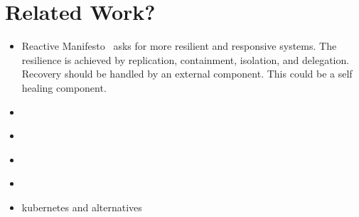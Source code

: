 \section{Related Work?}
  \begin{itemize}
    \item Reactive Manifesto~\cite{reactivemanifesto} asks for more resilient and responsive systems. The resilience is achieved by replication, containment, isolation, and delegation. Recovery should be handled by an external component. This could be a self healing component.
    \item \cite{ToffettiMicroservices}
    \item \cite{StackCloud}
    \item \cite{gru}
    \item \cite{DashofyArchitecture}
    \item \gls{kubernetes} and alternatives
  \end{itemize}

